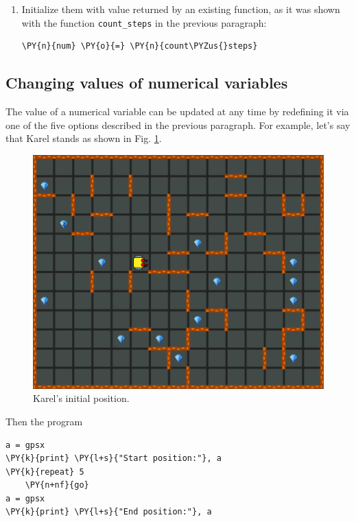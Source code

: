 \begin{enumerate}
\noindent
\item Initialize them with value returned by an existing function, as it was shown 
with the function {\tt count\_steps} in the previous paragraph:\\[-6mm]

\begin{bbox}
\begin{Verbatim}[commandchars=\\\{\}]
\PY{n}{num} \PY{o}{=} \PY{n}{count\PYZus{}steps}
\end{Verbatim}
\end{bbox}
\end{enumerate}

\subsection[\ \ Changing values of numerical variables]{Changing values of numerical variables}

The value of a numerical variable can be updated at any time by redefining it via 
one of the five options described in the previous paragraph. For example, let's say that 
Karel stands as shown in Fig. \ref{fig:var1}.

\begin{figure}[!ht]
\begin{center}
\includegraphics[height=0.4\textwidth]{img/variables1.png}
\end{center}
\vspace{-4mm}
\caption{Karel's initial position.}
\label{fig:var1}
\vspace{-1cm}
\end{figure}
\newpage
\noindent
Then the program\\

\begin{bbox}
\begin{Verbatim}[commandchars=\\\{\}]
a = gpsx
\PY{k}{print} \PY{l+s}{"Start position:"}, a
\PY{k}{repeat} 5
    \PY{n+nf}{go}
a = gpsx 
\PY{k}{print} \PY{l+s}{"End position:"}, a
\end{Verbatim}
\end{bbox}
\vspace{6mm}

